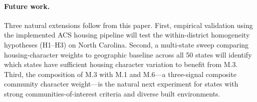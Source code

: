\paragraph{Future work.}
Three natural extensions follow from this paper.
First, empirical validation using the implemented ACS housing pipeline will test
the within-district homogeneity hypotheses (H1--H3) on North Carolina.
Second, a multi-state sweep comparing housing-character weights to geographic
baseline across all 50 states will identify which states have sufficient
housing character variation to benefit from M.3.
Third, the composition of M.3 with M.1 and M.6---a three-signal composite
community character weight---is the natural next experiment for states with
strong communities-of-interest criteria and diverse built environments.
